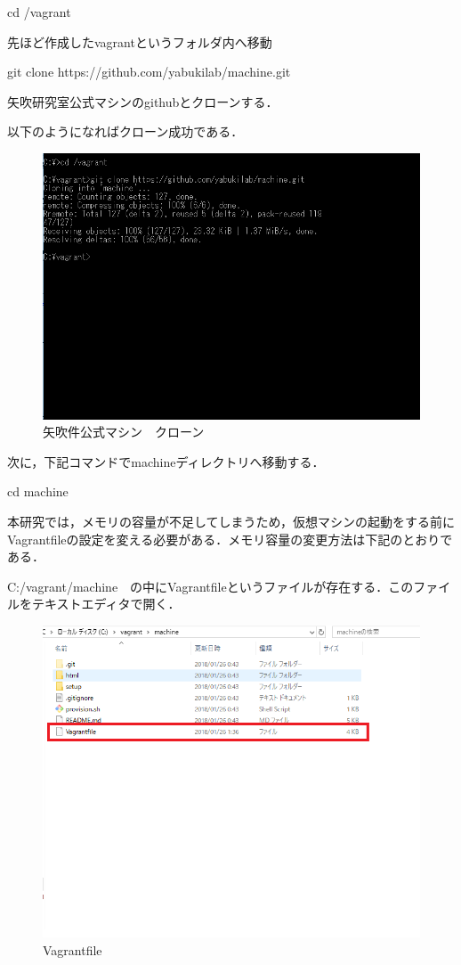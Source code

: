 cd /vagrant


先ほど作成したvagrantというフォルダ内へ移動


git clone https://github.com/yabukilab/machine.git


矢吹研究室公式マシンのgithubとクローンする．

以下のようになればクローン成功である．
\begin{figure}[htb]
\centering
\includegraphics[width=13cm]{4-21.png}
\caption{矢吹件公式マシン　クローン}\label{4-21}
\end{figure}
\newpage

次に，下記コマンドでmachineディレクトリへ移動する．

cd machine

本研究では，メモリの容量が不足してしまうため，仮想マシンの起動をする前にVagrantfileの設定を変える必要がある．メモリ容量の変更方法は下記のとおりである．

C:/vagrant/machine　の中にVagrantfileというファイルが存在する．このファイルをテキストエディタで開く．

\begin{figure}[htb]
\centering
\includegraphics[width=13cm]{4-22.png}
\caption{Vagrantfile}\label{4-22}
\end{figure}
\newpage

